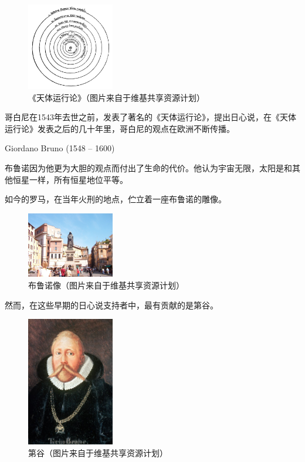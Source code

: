 \documentclass[a4paper,10.5pt]{article}
\begin{document}
\begin{figure}[ht]
\centering
\includegraphics[width=1.5in]{images/1_06-Copernican_heliocentrism_theory_diagram.png}
\caption{《天体运行论》（图片来自于维基共享资源计划）}
\end{figure}

哥白尼在1543年去世之前，发表了著名的《天体运行论》，提出日心说，在《天体运行论》发表之后的几十年里，哥白尼的观点在欧洲不断传播。

Giordano Bruno (1548 – 1600)

布鲁诺因为他更为大胆的观点而付出了生命的代价。他认为宇宙无限，太阳是和其他恒星一样，所有恒星地位平等。

如今的罗马，在当年火刑的地点，伫立着一座布鲁诺的雕像。

\begin{figure}[ht]
\centering
\includegraphics[width=1.5in]{images/1_07-Brunostatue.jpg}
\caption{布鲁诺像（图片来自于维基共享资源计划）}
\end{figure}

然而，在这些早期的日心说支持者中，最有贡献的是第谷。

\begin{figure}[ht]
\centering
\includegraphics[width=1.5in]{images/1_08-Tycho_Brahe.jpg}
\caption{第谷（图片来自于维基共享资源计划）}
\end{figure}
\end{document}
